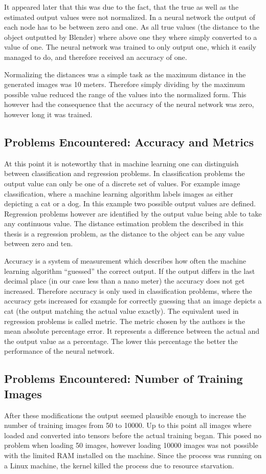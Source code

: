 It appeared later that this was due to the fact, that the true as well as the estimated output values were not normalized. In a neural network the output of each node has to be between zero and one. As all true values (the distance to the object outputted by Blender) where above one they where simply converted to a value of one. The neural network was trained to only output one, which it easily managed to do, and therefore received an accuracy of one.

Normalizing the distances was a simple task as the maximum distance in the generated images was 10 meters. Therefore simply dividing by the maximum possible value reduced the range of the values into the normalized form. This however had the consequence that the accuracy of the neural network was zero, however long it was trained.

\subsection{Problems Encountered: Accuracy and Metrics}
At this point it is noteworthy that in machine learning one can distinguish between classification and regression problems. In classification problems the output value can only be one of a discrete set of values. For example image classification, where a machine learning algorithm labels images as either depicting a cat or a dog. In this example two possible output values are defined. Regression problems however are identified by the output value being able to take any continuous value. The distance estimation problem the described in this thesis is a regression problem, as the distance to the object can be any value between zero and ten.

Accuracy is a system of measurement which describes how often the machine learning algorithm ``guessed'' the correct output. If the output differs in the last decimal place (in our case less than a nano meter) the accuracy does not get increased. Therefore accuracy is only used in classification problems, where the accuracy gets increased for example for correctly guessing that an image depicts a cat (the output matching the actual value exactly). The equivalent used in regression problems is called metric. The metric chosen by the authors is the mean absolute percentage error. It represents a difference between the actual and the output value as a percentage. The lower this percentage the better the performance of the neural network.

\subsection{Problems Encountered: Number of Training Images}
After these modifications the output seemed plausible enough to increase the number of training images from 50 to 10000. Up to this point all images where loaded and converted into tensors before the actual training began. This posed no problem when loading 50 images, however loading 10000 images was not possible with the limited RAM installed on the machine. Since the process was running on a Linux machine, the kernel killed the process due to resource starvation.

